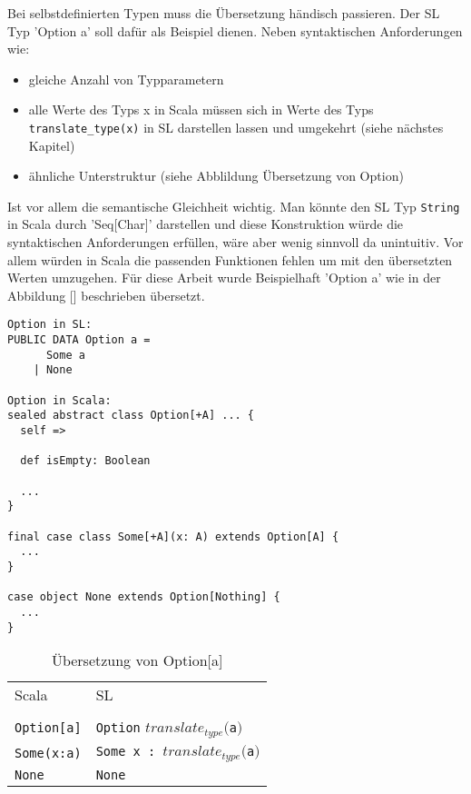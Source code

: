 \documentclass[12pt]{scrreprt}
\begin{document}
Bei selbstdefinierten Typen muss die Übersetzung händisch passieren. Der \ac{SL} Typ 'Option a' soll dafür als Beispiel dienen. Neben syntaktischen Anforderungen wie:
\begin{itemize}
  \item gleiche Anzahl von Typparametern
  \item alle Werte des Typs x in Scala müssen sich in Werte des Typs \lstinline!translate_type(x)! in \ac{SL} darstellen lassen und umgekehrt (siehe nächstes Kapitel)
  \item ähnliche Unterstruktur (siehe Abblildung Übersetzung von Option)
\end{itemize}
Ist vor allem die semantische Gleichheit wichtig. Man könnte den \ac{SL} Typ \lstinline!String! in Scala durch 'Seq[Char]' darstellen und diese Konstruktion würde die syntaktischen Anforderungen erfüllen, wäre aber wenig sinnvoll da unintuitiv. Vor allem würden in Scala die passenden Funktionen fehlen um mit den übersetzten Werten umzugehen.
Für diese Arbeit wurde Beispielhaft 'Option a' wie in der Abbildung [] beschrieben übersetzt.

\begin{lstlisting}[caption=Option in \ac{SL} und Scala, label=lst:bsp2]
Option in SL:
PUBLIC DATA Option a =
	  Some a
	| None

Option in Scala:
sealed abstract class Option[+A] ... {
  self =>

  def isEmpty: Boolean
  
  ...
}

final case class Some[+A](x: A) extends Option[A] {
  ...
}

case object None extends Option[Nothing] {
  ...
}
\end{lstlisting}


\begin{table}
\caption{Übersetzung von Option[a]}
\centering
\begin{tabular}{ll}
Scala                 & \ac{SL} \\\\

\lstinline!Option[a]! & \lstinline!Option! $translate_{type}($\lstinline!a!$)$ \\
\lstinline!Some(x:a)! & \lstinline!Some x : !$translate_{type}($\lstinline!a!$)$ \\
\lstinline!None!      & \lstinline!None! \\
\end{tabular}
\end{table}
\end{document}
